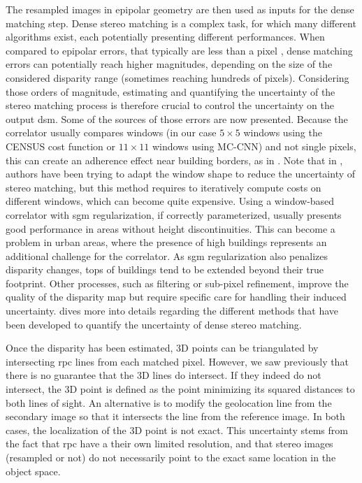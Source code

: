 The resampled images in epipolar geometry are then used as inputs for the dense matching step. Dense stereo matching is a complex task, for which many different algorithms exist, each potentially presenting different performances. When compared to epipolar errors, that typically are less than a pixel \cite{franchis_automatic_2014}, dense matching errors can potentially reach higher magnitudes, depending on the size of the considered disparity range (sometimes reaching hundreds of pixels). Considering those orders of magnitude, estimating and quantifying the uncertainty of the stereo matching process is therefore crucial to control the uncertainty on the output \acrshort{dsm}. Some of the sources of those errors are now presented. Because the correlator usually compares windows (in our case $5\times5$ windows using the CENSUS cost function or $11\times11$ windows using MC-CNN) and not single pixels, this can create an adherence effect near building borders, as in . Note that in \cite{okutomi_stereo_1994}, authors have been trying to adapt the window shape to reduce the uncertainty of stereo matching, but this method requires to iteratively compute costs on different windows, which can become quite expensive. Using a window-based correlator with \acrshort{sgm} regularization, if correctly parameterized, usually presents good performance in areas without height discontinuities. This can become a problem in urban areas, where the presence of high buildings represents an additional challenge for the correlator. As \acrshort{sgm} regularization also penalizes disparity changes, tops of buildings tend to be extended beyond their true footprint. Other processes, such as filtering or sub-pixel refinement, improve the quality of the disparity map but require specific care for handling their induced uncertainty.  dives more into details regarding the different methods that have been developed to quantify the uncertainty of dense stereo matching.

Once the disparity has been estimated, 3D points can be triangulated by intersecting \acrshort{rpc} lines from each matched pixel. However, we saw previously that there is no guarantee that the 3D lines do intersect. If they indeed do not intersect, the 3D point is defined as the point minimizing its squared distances to both lines of sight. An alternative is to modify the geolocation line from the secondary image so that it intersects the line from the reference image. In both cases, the localization of the 3D point is not exact. This uncertainty stems from the fact that \acrshort{rpc} have a their own limited resolution, and that stereo images (resampled or not) do not necessarily point to the exact same location in the object space.

